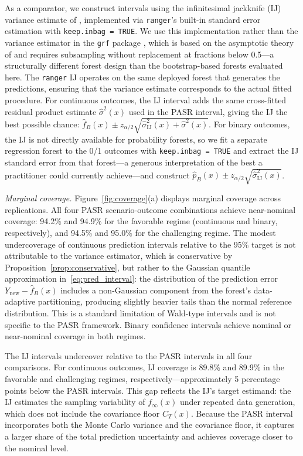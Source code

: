 \documentclass[11pt]{article}
\theoremstyle{plain}
\theoremstyle{definition}
\theoremstyle{remark}
\begin{document}
As a comparator, we construct intervals using the infinitesimal jackknife (IJ) variance estimate of \citet{wager2014}, implemented via \texttt{ranger}'s built-in standard error estimation with \texttt{keep.inbag = TRUE}. We use this implementation rather than the variance estimator in the \texttt{grf} package \citep{athey2019}, which is based on the asymptotic theory of \citet{wager2018} and requires subsampling without replacement at fractions below 0.5---a structurally different forest design than the bootstrap-based forests evaluated here. The \texttt{ranger} IJ operates on the same deployed forest that generates the predictions, ensuring that the variance estimate corresponds to the actual fitted procedure. For continuous outcomes, the IJ interval adds the same cross-fitted residual product estimate $\hat\sigma^2(x)$ used in the PASR interval, giving the IJ the best possible chance: $\hat f_B(x) \pm z_{\alpha/2}\sqrt{\hat\sigma^2_{\mathrm{IJ}}(x) + \hat\sigma^2(x)}$. For binary outcomes, the IJ is not directly available for probability forests, so we fit a separate regression forest to the 0/1 outcomes with \texttt{keep.inbag = TRUE} and extract the IJ standard error from that forest---a generous interpretation of the best a practitioner could currently achieve---and construct $\hat p_B(x) \pm z_{\alpha/2}\sqrt{\hat\sigma^2_{\mathrm{IJ}}(x)}$. 

\medskip
\noindent\textit{Marginal coverage.}\quad
Figure~\ref{fig:coverage}(a) displays marginal coverage across replications. All four PASR scenario-outcome combinations achieve near-nominal coverage: 94.2\% and 94.9\% for the favorable regime (continuous and binary, respectively), and 94.5\% and 95.0\% for the challenging regime. The modest undercoverage of continuous prediction intervals relative to the 95\% target is not attributable to the variance estimator, which is conservative by Proposition~\ref{prop:conservative}, but rather to the Gaussian quantile approximation in~\eqref{eq:pred_interval}: the distribution of the prediction error $Y_{\mathrm{new}} - \hat f_B(x)$ includes a non-Gaussian component from the forest's data-adaptive partitioning, producing slightly heavier tails than the normal reference distribution. This is a standard limitation of Wald-type intervals and is not specific to the PASR framework. Binary confidence intervals achieve nominal or near-nominal coverage in both regimes.

The IJ intervals undercover relative to the PASR intervals in all four comparisons. For continuous outcomes, IJ coverage is 89.8\% and 89.9\% in the favorable and challenging regimes, respectively---approximately 5 percentage points below the PASR intervals. This gap reflects the IJ's target estimand: the IJ estimates the sampling variability of $f_\infty(x)$ under repeated data generation, which does not include the covariance floor $C_T(x)$. Because the PASR interval incorporates both the Monte Carlo variance and the covariance floor, it captures a larger share of the total prediction uncertainty and achieves coverage closer to the nominal level.
\end{document}
